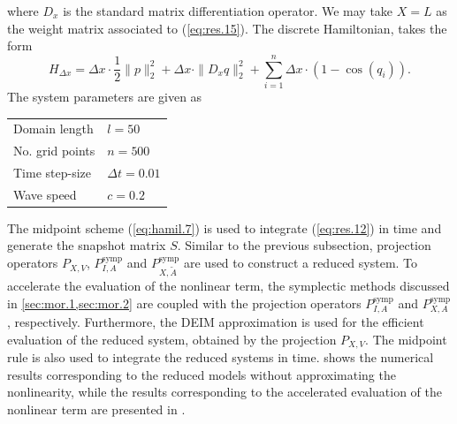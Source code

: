 where $D_x$ is the standard matrix differentiation operator. We may take $X = L$ as the weight matrix associated to (\ref{eq:res.15}). The discrete Hamiltonian, takes the form
\begin{equation} \label{eq:res.17}
	H_{\Delta x} = \Delta x \cdot \frac 1 2 \| p \|^2_2 + \Delta x \cdot \| D_x q \|^2_2 + \sum_{i=1}^{n} \Delta x \cdot ( 1 - \cos(q_i) ).
\end{equation}
The system parameters are given as
\vspace{0.5cm}
\begin{center}
\begin{tabular}{|l|l|}
\hline
Domain length & $l = 50$ \\
No. grid points & $n = 500$ \\
Time step-size & $\Delta t = 0.01$ \\
Wave speed & $c=0.2$ \\
\hline
\end{tabular}
\end{center}
\vspace{0.5cm}
The midpoint scheme (\ref{eq:hamil.7}) is used to integrate (\ref{eq:res.12}) in time and generate the snapshot matrix $S$. Similar to the previous subsection, projection operators $P_{X,V}$, $P^{\text{symp}}_{I,A}$ and $P^{\text{symp}}_{X,\tilde A}$ are used to construct a reduced system. To accelerate the evaluation of the nonlinear term, the symplectic methods discussed in \cref{sec:mor.1,sec:mor.2} are coupled with the projection operators $P^{\text{symp}}_{I,A}$ and $P^{\text{symp}}_{X,A}$, respectively. Furthermore, the DEIM approximation is used for the efficient evaluation of the reduced system, obtained by the projection $P_{X,V}$. The midpoint rule is also used to integrate the reduced systems in time.  shows the numerical results corresponding to the reduced models without approximating the nonlinearity, while the results corresponding to the accelerated evaluation of the nonlinear term are presented in .

